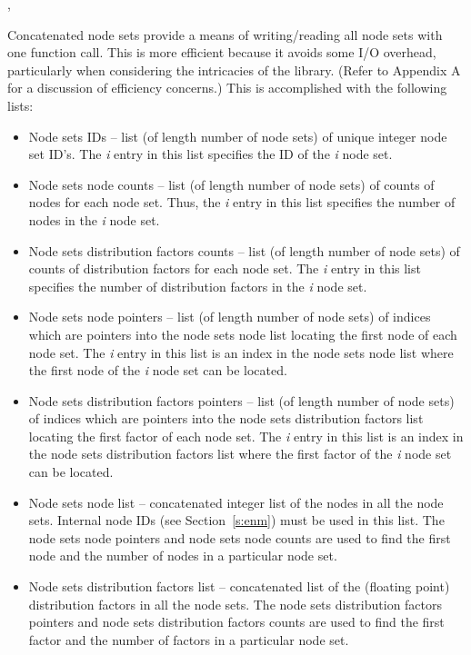 \begin{spacing}{1.5}
\api {}, 
\end{spacing}

Concatenated node sets provide a means of writing/reading all node
sets with one function call. This is more efficient because it avoids
some I/O overhead, particularly when considering the intricacies of
the  library. (Refer to Appendix A for a discussion of
efficiency concerns.) This is accomplished with the following lists:

\begin{itemize}

 \item Node sets IDs -- list (of length number of node sets) 
of unique integer node set ID's. The \textit{{i}}\th{} entry in 
this list specifies the ID of the \textit{{i}}\th{} node set.

 \item Node sets node counts -- list (of length number of 
node sets) of counts of nodes for each node set. Thus, the \textit{{i}}\th{} 
entry in this list specifies the number of nodes in the \textit{{i}}\th{} 
node set.

 \item Node sets distribution factors counts -- list (of 
length number of node sets) of counts of distribution factors 
for each node set. The \textit{{i}}\th{} entry in this list specifies 
the number of distribution factors in the \textit{{i}}\th{} node 
set.

 \item Node sets node pointers -- list (of length number 
of node sets) of indices which are pointers into the node sets 
node list locating the first node of each node set. The \textit{{i}}\th{} 
entry in this list is an index in the node sets node list where 
the first node of the \textit{{i}}\th{} node set can be located.

 \item Node sets distribution factors pointers -- list (of 
length number of node sets) of indices which are pointers into 
the node sets distribution factors list locating the first factor 
of each node set. The \textit{{i}}\th{} entry in this list is an 
index in the node sets distribution factors list where the first 
factor of the \textit{{i}}\th{} node set can be located.

 \item Node sets node list -- concatenated integer list of the nodes
 in all the node sets. Internal node IDs (see Section~\ref{s:enm})
 must be used in this list. The node sets node pointers and node sets
 node counts are used to find the first node and the number of nodes
 in a particular node set.

 \item Node sets distribution factors list -- concatenated 
list of the (floating point) distribution factors in all the 
node sets. The node sets distribution factors pointers and node 
sets distribution factors counts are used to find the first factor 
and the number of factors in a particular node set.

\end{itemize}

